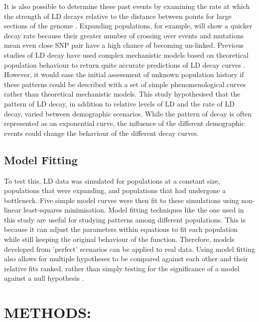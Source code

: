 \documentclass[11pt]{article}
\begin{document}
\begin{linenumbers}
It is also possible to determine these past events by examining the rate at which the strength of LD decays relative to the distance between points for large sections of the genome \citep{hernandez2007demographic, park2012linkage}. Expanding populations, for example, will show a quicker decay rate because their greater number of crossing over events and mutations mean even close SNP pair have a high chance of becoming un-linked. Previous studies of LD decay have used complex mechanistic models based on theoretical population behaviour to return quite accurate predictions of LD decay curves \citep{park2012linkage}.  However, it would ease the initial assessment of unknown population history if these patterns could be described with a set of simple phenomenological curves rather than theoretical mechanistic models. This study hypothesised that the pattern of LD decay, in addition to relative levels of LD and the rate of LD decay, varied between demographic scenarios. While the pattern of decay is often represented as an exponential curve, the influence of the different demographic events could change the behaviour of the different decay curves. 

\subsection{Model Fitting}
To test this, LD data was simulated for populations at a constant size, populations that were expanding, and populations that had undergone a bottleneck. Five simple model curves were then fit to these simulations using non-linear least-squares minimisation. Model fitting techniques like the one used in this study are useful for studying patterns among different populations. This is because it can adjust the parameters within equations to fit each population while still keeping the original behaviour of the function. Therefore, models developed from 'perfect' scenarios can be applied to real data. Using model fitting also allows for multiple hypotheses to be compared against each other and their relative fits ranked, rather than simply testing for the significance of a model against a null hypothesis \citep{johnson2004model, gray2009linkage}. 	

\section{METHODS:}


\end{linenumbers}
\end{document}
